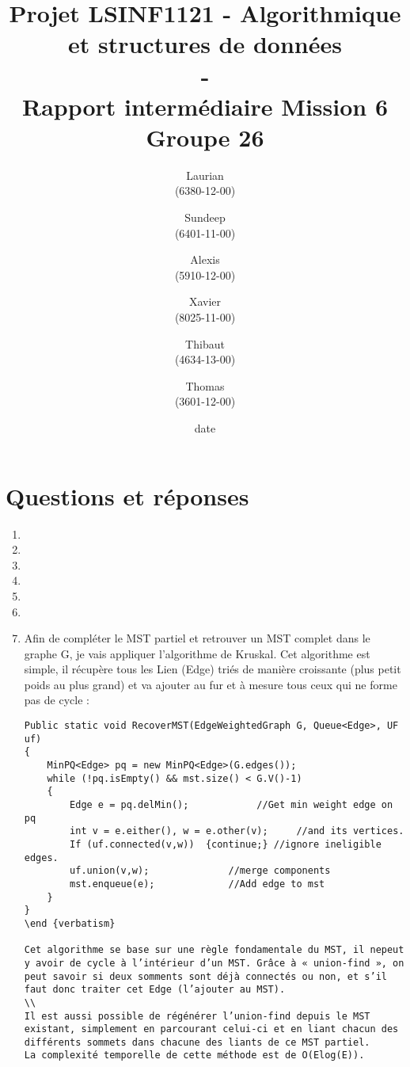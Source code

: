 \documentclass[11pt]{article}
\title{\textbf{Projet LSINF1121 -  Algorithmique et structures de données\\ - \\ Rapport intermédiaire Mission 6} \\ {\large Groupe 26}}
\author{Laurian \bsc{Detiffe} \\(6380-12-00)\and Sundeep \bsc{Dhillon} \\(6401-11-00)\and Alexis \bsc{Macq} \\ (5910-12-00) \and Xavier \bsc{Pérignon} \\ (8025-11-00)\and Thibaut \bsc{Piquard}\\(4634-13-00)\and Thomas \bsc{Wyckmans} \\ (3601-12-00)}
\date{date}
\date{\vspace*{25mm}
\texttt{[image: logo.jpg]}\\
		\vspace*{30mm}
		\begin{center}
		Année académique 2015-2016 \\	
		\end{center}}
\begin{document}
\thispagestyle{empty}

\maketitle
\thispagestyle{empty}

\section*{Questions et réponses}
\begin{enumerate}

\item

\item  

\item 

\item 

\item 

\item 

\item Afin de compléter le MST partiel et retrouver un MST complet dans le graphe G, je vais appliquer l’algorithme de Kruskal. Cet algorithme est simple, il récupère tous les Lien (Edge) triés de manière croissante (plus petit poids au plus grand) et va ajouter au fur et à mesure tous ceux qui ne forme pas de cycle :
\\
\begin {verbatim}
Public static void RecoverMST(EdgeWeightedGraph G, Queue<Edge>, UF uf)
{
	MinPQ<Edge> pq = new MinPQ<Edge>(G.edges());
	while (!pq.isEmpty() && mst.size() < G.V()-1)
	{
		Edge e = pq.delMin();   		 //Get min weight edge on pq
		int v = e.either(), w = e.other(v); 	//and its vertices.
		If (uf.connected(v,w))  {continue;}	//ignore ineligible edges.
		uf.union(v,w); 				//merge components 
		mst.enqueue(e);				//Add edge to mst
	}
}
\end {verbatism}

Cet algorithme se base sur une règle fondamentale du MST, il nepeut y avoir de cycle à l’intérieur d’un MST. Grâce à « union-find », on peut savoir si deux somments sont déjà connectés ou non, et s’il faut donc traiter cet Edge (l’ajouter au MST).
\\
Il est aussi possible de régénérer l’union-find depuis le MST existant, simplement en parcourant celui-ci et en liant chacun des différents sommets dans chacune des liants de ce MST partiel.
La complexité temporelle de cette méthode est de O(Elog(E)).


\end{verbatim}
\end{enumerate}
\end{document}
